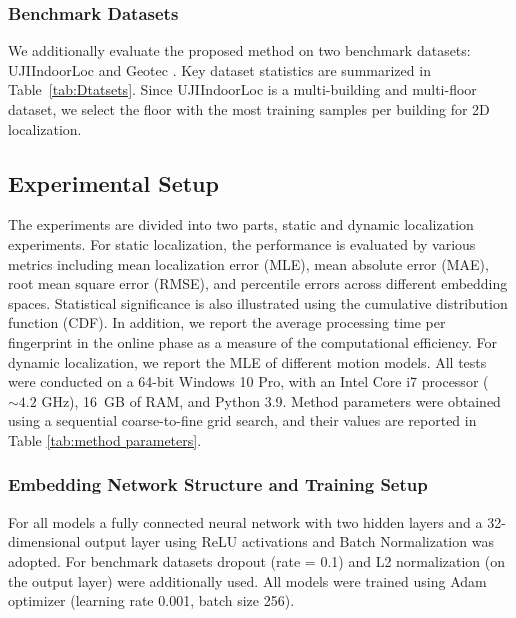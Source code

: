 \documentclass[journal,twoside,web]{ieeecolor}
\begin{document}
\subsubsection{Benchmark Datasets}
We additionally evaluate the proposed method on two benchmark datasets: UJIIndoorLoc \cite{refUJIIndoorLoc} and Geotec \cite{refGeoTech}. Key dataset statistics are summarized in Table~\ref{tab:Dtatsets}. Since UJIIndoorLoc is a multi-building and multi-floor dataset, we select the floor with the most training samples per building for 2D localization. 
\subsection{Experimental Setup}
The experiments are divided into two parts, static and dynamic localization experiments. For static localization, the performance is evaluated by various metrics including mean localization error (MLE), mean absolute error (MAE), root mean square error (RMSE), and percentile errors across different embedding spaces. Statistical significance is also illustrated using the cumulative distribution function (CDF). In addition, we report the average processing time per fingerprint in the online phase as a measure of the computational efficiency. 
For dynamic localization, we report the MLE of different motion models. All tests were conducted on a 64-bit Windows 10 Pro, with an Intel Core i7 processor (\(\sim 4.2\) GHz), 16~GB of RAM, and Python 3.9. 
Method parameters were obtained using a sequential coarse-to-fine grid search, and their values are reported in Table \ref{tab:method parameters}. 
\subsubsection{Embedding Network Structure and Training Setup}
For all models a fully connected neural network with two hidden layers and a 32-dimensional output layer using ReLU activations and Batch Normalization was adopted. For benchmark datasets dropout (rate = 0.1) and L2 normalization (on the output layer) were additionally used. All models were trained using Adam optimizer (learning rate 0.001, batch size 256).
\end{document}

